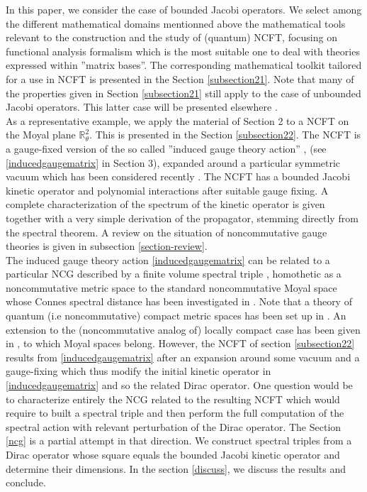 \documentclass[a4paper,11pt,twoside]{article}
\numberwithin{equation}{section}
\theoremstyle{nonumberplain}
\newcounter{and}
\begin{document}
In this paper, we consider the case of bounded Jacobi operators. We select among the different mathematical domains mentionned above the mathematical tools relevant to the construction and the study of (quantum) NCFT, focusing on functional analysis formalism which is the most suitable one to deal with theories expressed within ''matrix bases''. The corresponding mathematical toolkit tailored for a use in NCFT is presented in the Section \ref{subsection21}. Note that many of the properties given in Section \ref{subsection21} still apply to the case of unbounded Jacobi operators. This latter case will be presented elsewhere \cite{unboud-jac}. \\
As a representative example, we apply the material of Section 2 to a NCFT on the Moyal plane $\mathbb{R}^2_\theta$. This is presented in the Section \ref{subsection22}. The NCFT is a gauge-fixed version of the so called ''induced gauge theory action'' \cite{GWW}, \cite{GW07} (see \eqref{inducedgaugematrix} in Section 3), expanded around a particular symmetric vacuum \cite{GWW2} which has been considered recently \cite{MVW13}. The NCFT has a bounded Jacobi kinetic operator and polynomial interactions after suitable gauge fixing. A complete characterization of the spectrum of the kinetic operator is given together with a very simple derivation of the propagator, stemming directly from the spectral theorem. A review on the situation of noncommutative gauge theories is given in subsection \ref{section-review}.\\
The induced gauge theory action \eqref{inducedgaugematrix} can be related to a particular NCG described by a finite volume spectral triple \cite{finite-vol}, homothetic as a noncommutative metric space \cite{homot-moyal} to the standard noncommutative Moyal space \cite{marseil1} whose Connes spectral distance has been investigated in \cite{moyal1}. Note that a theory of quantum (i.e noncommutative) compact metric spaces has been set up in \cite{Rieffel}. An extension to the (noncommutative analog of) locally compact case has been given in \cite{latrem}, to which Moyal spaces belong. However, the NCFT of section \ref{subsection22} results from \eqref{inducedgaugematrix} after an expansion around some vacuum and a gauge-fixing which thus modify the initial kinetic operator in \eqref{inducedgaugematrix} and so the related Dirac operator. One question would be to characterize entirely the NCG related to the resulting NCFT which would require to built a spectral triple and then perform the full computation of the 
spectral action with relevant perturbation of the Dirac operator. The Section \ref{ncg} is a partial attempt in that direction. We construct spectral triples from a Dirac operator whose square equals the bounded Jacobi kinetic operator and determine their dimensions. In the section \ref{discuss}, we discuss the results and conclude.\par 
\end{document}
